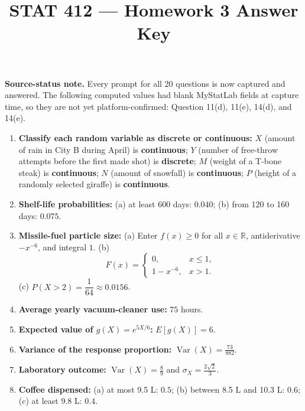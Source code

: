 \documentclass[11pt]{article}
\title{STAT 412 --- Homework 3 Answer Key}
\author{}
\date{}
\begin{document}
\maketitle

\noindent\textbf{Source-status note.} Every prompt for all 20 questions is now
captured and answered. The following computed values had blank MyStatLab fields
at capture time, so they are not yet platform-confirmed: Question 11(d), 11(e),
14(d), and 14(e).

\begin{enumerate}[leftmargin=*,label=\textbf{\arabic*.}]
\item \textbf{Classify each random variable as discrete or continuous:}
$X$ (amount of rain in City B during April) is \textbf{continuous};
$Y$ (number of free-throw attempts before the first made shot) is
\textbf{discrete};
$M$ (weight of a T-bone steak) is \textbf{continuous};
$N$ (amount of snowfall) is \textbf{continuous};
$P$ (height of a randomly selected giraffe) is \textbf{continuous}.

\item \textbf{Shelf-life probabilities:}
(a) at least 600 days: $0.040$;
(b) from 120 to 160 days: $0.075$.

\item \textbf{Missile-fuel particle size:}
(a) Enter $f(x)\ge0$ for all $x\in\mathbb{R}$, antiderivative $-x^{-6}$, and
integral $1$.
(b)
\[
F(x)=
\begin{cases}
0,&x\le1,\\
1-x^{-6},&x>1.
\end{cases}
\]
(c) $P(X>2)=\dfrac1{64}\approx0.0156$.

\item \textbf{Average yearly vacuum-cleaner use:} $75$ hours.

\item \textbf{Expected value of $g(X)=e^{5X/6}$:} $E[g(X)]=6$.

\item \textbf{Variance of the response proportion:}
$\displaystyle \operatorname{Var}(X)=\frac{73}{882}$.

\item \textbf{Laboratory outcome:}
$\displaystyle \operatorname{Var}(X)=\frac89$ and
$\displaystyle \sigma_X=\frac{2\sqrt2}{3}$.

\item \textbf{Coffee dispensed:}
(a) at most 9.5 L: $0.5$;
(b) between 8.5 L and 10.3 L: $0.6$;
(c) at least 9.8 L: $0.4$.


\end{enumerate}
\end{document}
